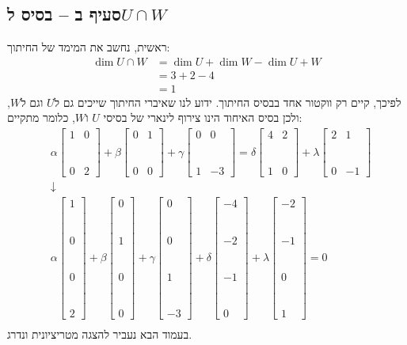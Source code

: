\documentclass[11pt, oneside]{article}
\newcommand{\br}{\\\\\\\\\\\\}
\newcommand{\tot}[4]{\begin{bmatrix}#1 & #2\br#3 & #4\end{bmatrix}}
\newcommand{\fcol}[4]{\begin{bmatrix}#1 \br #2\br#3 \br #4\end{bmatrix}}
\begin{document}
\subsection{סעיף ב -- בסיס ל$U \cap W$}
ראשית, נחשב את המימד של החיתוך:
\begin{align*}
\dim{U \cap W}
& = \dim{U} + \dim{W} - \dim{U + W}\\
& = 3 + 2 - 4\\
& = 1
\end{align*}
לפיכך, קיים רק ווקטור אחד בבסיס החיתוך. ידוע לנו שאיברי החיתוך שייכים גם ל$U$ וגם ל$W$, ולכן בסיס האיחוד הינו צירוף לינארי של בסיסי $U$ ו$W$, כלומר מתקיים:
\begin{eqnarray*}
& \alpha\tot{1}{0}{0}{2} + \beta\tot{0}{1}{0}{0} + \gamma\tot{0}{0}{1}{-3} = \delta\tot{4}{2}{1}{0} + \lambda\tot{2}{1}{0}{-1}\\
& \downarrow\\
& \alpha\fcol{1}{0}{0}{2} + \beta\fcol{0}{1}{0}{0} + \gamma\fcol{0}{0}{1}{-3} + \delta\fcol{-4}{-2}{-1}{0} + \lambda\fcol{-2}{-1}{0}{1} = 0\\
\end{eqnarray*}
בעמוד הבא נעביר להצגה מטריציונית ונדרג.
\clearpage
\setcounter{subsection}{1}
\end{document}

